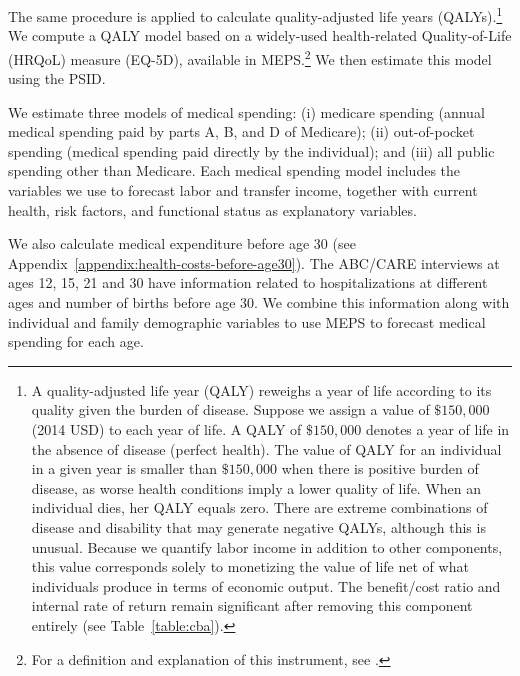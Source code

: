 The same procedure is applied to calculate quality-adjusted life years (QALYs).\footnote{A quality-adjusted life year (QALY) reweighs a year of life according to its quality given the burden of disease. Suppose we assign a value of $\$150,000$ (2014 USD) to each year of life. A QALY of $\$150,000$ denotes a year of life in the absence of disease (perfect health). The value of QALY for an individual in a given year is smaller than $\$150,000$ when there is positive burden of disease, as worse health conditions imply a lower quality of life. When an individual dies, her QALY equals zero. There are extreme combinations of disease and disability that may generate negative QALYs, although this is unusual. Because we quantify labor income in addition to other components, this value corresponds solely to monetizing the value of life net of what individuals produce in terms of economic output. The benefit/cost ratio and internal rate of return remain significant after removing this component entirely (see Table~\ref{table:cba}).} We compute a QALY model based on a widely-used health-related Quality-of-Life (HRQoL) measure (EQ-5D), available in MEPS.\footnote{For a definition and explanation of this instrument, see \citet{Dolan_1997_Modeling_MC,Shaw_etal_2005_EQ5D_MC}.} We then estimate this model using the PSID.

We estimate three models of medical spending: (i) medicare spending (annual medical spending paid by parts A, B, and D of Medicare); (ii) out-of-pocket spending (medical spending paid directly by the individual); and (iii) all public spending other than Medicare. Each medical spending model includes the variables we use to forecast labor and transfer income, together with current health, risk factors, and functional status as explanatory variables.

We also calculate medical expenditure before age 30 (see Appendix~\ref{appendix:health-costs-before-age30}). The ABC/CARE interviews at ages 12, 15, 21 and 30 have information related to hospitalizations at different ages and number of births before age 30. We combine this information along with individual and family demographic variables to use MEPS to forecast medical spending for each age.

